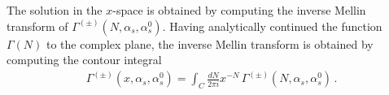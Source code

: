 %
The solution in the $x$-space is obtained by computing the inverse Mellin
transform of $\Gamma^{(\pm)}\left(N,\alpha_s,\alpha_s^0\right)$. Having
analytically continued the function $\Gamma\left(N\right)$ to the complex plane,
the inverse Mellin transform is obtained by computing the contour integral
\begin{align}
    \Gamma^{(\pm)}\left(x,\alpha_s,\alpha_s^0\right) = 
    \int_C \frac{dN}{2\pi i}x^{-N}\, 
    \Gamma^{(\pm)}\left(N,\alpha_s,\alpha_s^0\right)\, .
\end{align}



